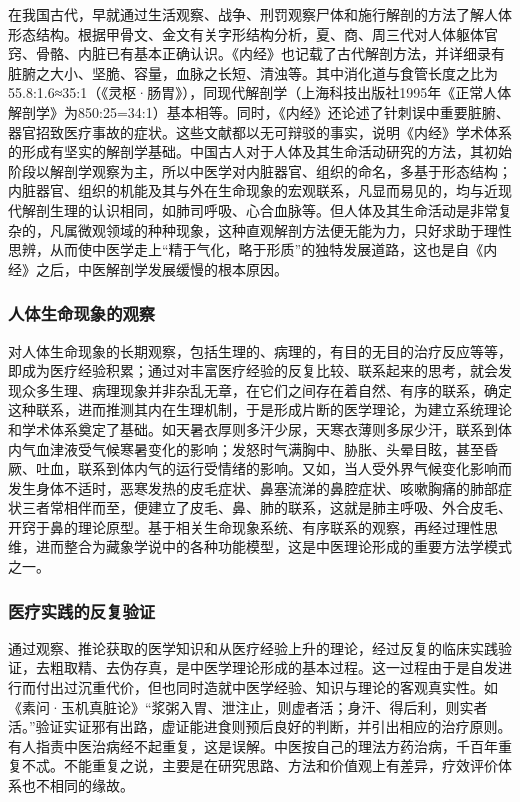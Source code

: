 \documentclass[draft,12pt]{ctexbook}
\begin{document}
在我国古代，早就通过生活观察、战争、刑罚观察尸体和施行解剖的方法了解人体形态结构。根据甲骨文、金文有关字形结构分析，夏、商、周三代对人体躯体官窍、骨骼、内脏已有基本正确认识。《内经》也记载了古代解剖方法，并详细录有脏腑之大小、坚脆、容量，血脉之长短、清浊等。其中消化道与食管长度之比为55.8:1.6≈35:1（《灵枢·肠胃》），同现代解剖学（上海科技出版社1995年《正常人体解剖学》为850:25=34:1）基本相等。同时，《内经》还论述了针刺误中重要脏腑、器官招致医疗事故的症状。这些文献都以无可辩驳的事实，说明《内经》学术体系的形成有坚实的解剖学基础。中国古人对于人体及其生命活动研究的方法，其初始阶段以解剖学观察为主，所以中医学对内脏器官、组织的命名，多基于形态结构；内脏器官、组织的机能及其与外在生命现象的宏观联系，凡显而易见的，均与近现代解剖生理的认识相同，如肺司呼吸、心合血脉等。但人体及其生命活动是非常复杂的，凡属微观领域的种种现象，这种直观解剖方法便无能为力，只好求助于理性思辨，从而使中医学走上“精于气化，略于形质”的独特发展道路，这也是自《内经》之后，中医解剖学发展缓慢的根本原因。

\subsubsection{人体生命现象的观察}%

对人体生命现象的长期观察，包括生理的、病理的，有目的无目的治疗反应等等，即成为医疗经验积累；通过对丰富医疗经验的反复比较、联系起来的思考，就会发现众多生理、病理现象并非杂乱无章，在它们之间存在着自然、有序的联系，确定这种联系，进而推测其内在生理机制，于是形成片断的医学理论，为建立系统理论和学术体系奠定了基础。如天暑衣厚则多汗少尿，天寒衣薄则多尿少汗，联系到体内气血津液受气候寒暑变化的影响；发怒时气满胸中、胁胀、头晕目眩，甚至昏厥、吐血，联系到体内气的运行受情绪的影响。又如，当人受外界气候变化影响而发生身体不适时，恶寒发热的皮毛症状、鼻塞流涕的鼻腔症状、咳嗽胸痛的肺部症状三者常相伴而至，便建立了皮毛、鼻、肺的联系，这就是肺主呼吸、外合皮毛、开窍于鼻的理论原型。基于相关生命现象系统、有序联系的观察，再经过理性思维，进而整合为藏象学说中的各种功能模型，这是中医理论形成的重要方法学模式之一。

\subsubsection{医疗实践的反复验证}%

通过观察、推论获取的医学知识和从医疗经验上升的理论，经过反复的临床实践验证，去粗取精、去伪存真，是中医学理论形成的基本过程。这一过程由于是自发进行而付出过沉重代价，但也同时造就中医学经验、知识与理论的客观真实性。如《素问·玉机真脏论》“浆粥入胃、泄注止，则虚者活；身汗、得后利，则实者活。”验证实证邪有出路，虚证能进食则预后良好的判断，并引出相应的治疗原则。有人指责中医治病经不起重复，这是误解。中医按自己的理法方药治病，千百年重复不忒。不能重复之说，主要是在研究思路、方法和价值观上有差异，疗效评价体系也不相同的缘故。
\end{document}
